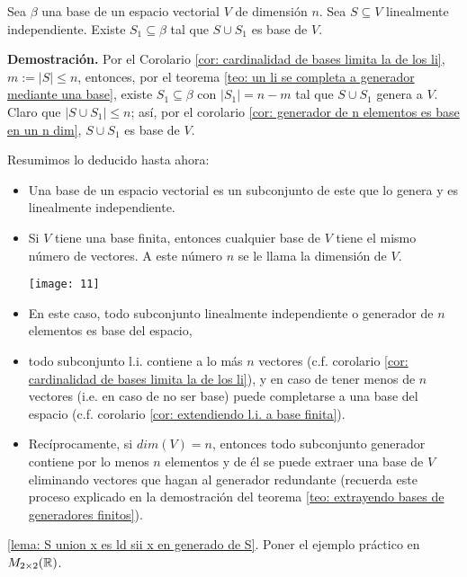\begin{cor}
	\label{cor: extendiendo l.i. a base finita}
Sea $\beta$ una base de un espacio vectorial $V$ de dimensión
$n$. Sea $S \subseteq V$ linealmente independiente. Existe
$S_{1} \subseteq \beta$ tal que $S \cup S_{1}$ es base de $V$.
\end{cor}
\noindent
\textbf{Demostración.}
Por el Corolario \ref{cor: cardinalidad de bases limita la de los li},
$m := |S| \leq n$, entonces, por el teorema 
\ref{teo: un li se completa a generador mediante una base},
existe $S_{1} \subseteq \beta$ con 
$|S_{1}| = n-m$ tal que $S \cup S_{1}$ genera a $V$.
Claro que $|S \cup S_{1}| \leq n$; así, por el corolario 
\ref{cor: generador de n elementos es base en un n dim}, 
$S \cup S_{1}$ es base de $V$.
\QEDB
\vspace{0.2cm}

Resumimos lo deducido hasta ahora:
\begin{itemize}
	\item Una base de un espacio vectorial es un subconjunto de este
	que lo genera y es linealmente independiente.
	\item Si $V$ tiene una base finita, entonces cualquier base de $V$
	tiene el mismo número de vectores. A este número $n$ se le llama la 
	dimensión de $V$.
	\begin{marginfigure}
		\texttt{[image: 11]}
	\end{marginfigure}
	\item En este caso, todo subconjunto linealmente independiente
	o generador de $n$ elementos es base del espacio,
	\item todo subconjunto l.i. contiene a lo más $n$
	vectores (c.f. corolario
	\ref{cor: cardinalidad de bases limita la de los li}),
	y en caso de tener menos de $n$ vectores (i.e. en caso de no ser base)
	puede completarse a una base
	del espacio (c.f. corolario 
	\ref{cor: extendiendo l.i. a base finita}).
	\item Recíprocamente, si $dim(V) = n$, entonces todo subconjunto
	generador contiene por lo menos $n$ elementos
	y de él se puede extraer una base de $V$ eliminando vectores
	que hagan al generador redundante (recuerda este proceso explicado
	en la demostración del teorema 
	\ref{teo: extrayendo bases de generadores finitos}).

\end{itemize}

\ref{lema: S union x es ld sii x en generado de S}. Poner el ejemplo
práctico en $M_{2 \times 2}(\mathbb{R})$.


